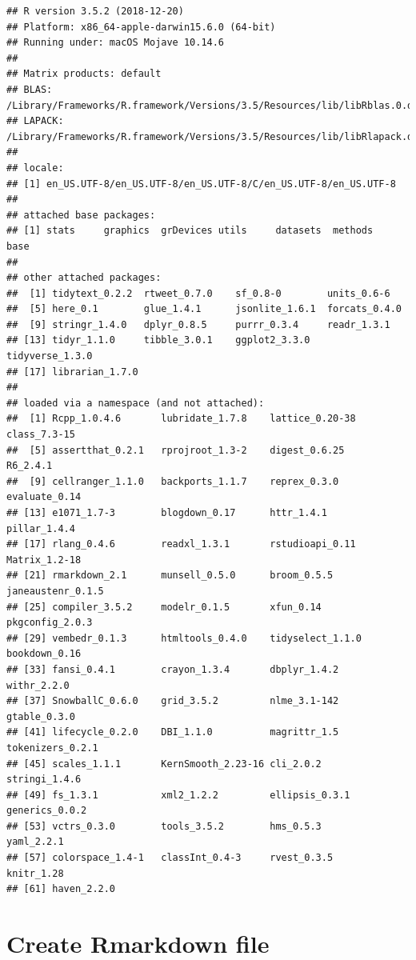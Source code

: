 \documentclass[]{book}
\begin{document}
\begin{verbatim}
## R version 3.5.2 (2018-12-20)
## Platform: x86_64-apple-darwin15.6.0 (64-bit)
## Running under: macOS Mojave 10.14.6
## 
## Matrix products: default
## BLAS: /Library/Frameworks/R.framework/Versions/3.5/Resources/lib/libRblas.0.dylib
## LAPACK: /Library/Frameworks/R.framework/Versions/3.5/Resources/lib/libRlapack.dylib
## 
## locale:
## [1] en_US.UTF-8/en_US.UTF-8/en_US.UTF-8/C/en_US.UTF-8/en_US.UTF-8
## 
## attached base packages:
## [1] stats     graphics  grDevices utils     datasets  methods   base     
## 
## other attached packages:
##  [1] tidytext_0.2.2  rtweet_0.7.0    sf_0.8-0        units_0.6-6    
##  [5] here_0.1        glue_1.4.1      jsonlite_1.6.1  forcats_0.4.0  
##  [9] stringr_1.4.0   dplyr_0.8.5     purrr_0.3.4     readr_1.3.1    
## [13] tidyr_1.1.0     tibble_3.0.1    ggplot2_3.3.0   tidyverse_1.3.0
## [17] librarian_1.7.0
## 
## loaded via a namespace (and not attached):
##  [1] Rcpp_1.0.4.6       lubridate_1.7.8    lattice_0.20-38    class_7.3-15      
##  [5] assertthat_0.2.1   rprojroot_1.3-2    digest_0.6.25      R6_2.4.1          
##  [9] cellranger_1.1.0   backports_1.1.7    reprex_0.3.0       evaluate_0.14     
## [13] e1071_1.7-3        blogdown_0.17      httr_1.4.1         pillar_1.4.4      
## [17] rlang_0.4.6        readxl_1.3.1       rstudioapi_0.11    Matrix_1.2-18     
## [21] rmarkdown_2.1      munsell_0.5.0      broom_0.5.5        janeaustenr_0.1.5 
## [25] compiler_3.5.2     modelr_0.1.5       xfun_0.14          pkgconfig_2.0.3   
## [29] vembedr_0.1.3      htmltools_0.4.0    tidyselect_1.1.0   bookdown_0.16     
## [33] fansi_0.4.1        crayon_1.3.4       dbplyr_1.4.2       withr_2.2.0       
## [37] SnowballC_0.6.0    grid_3.5.2         nlme_3.1-142       gtable_0.3.0      
## [41] lifecycle_0.2.0    DBI_1.1.0          magrittr_1.5       tokenizers_0.2.1  
## [45] scales_1.1.1       KernSmooth_2.23-16 cli_2.0.2          stringi_1.4.6     
## [49] fs_1.3.1           xml2_1.2.2         ellipsis_0.3.1     generics_0.0.2    
## [53] vctrs_0.3.0        tools_3.5.2        hms_0.5.3          yaml_2.2.1        
## [57] colorspace_1.4-1   classInt_0.4-3     rvest_0.3.5        knitr_1.28        
## [61] haven_2.2.0
\end{verbatim}

\hypertarget{create-rmarkdown-file}{%
\section{Create Rmarkdown file}\label{create-rmarkdown-file}}
\end{document}
